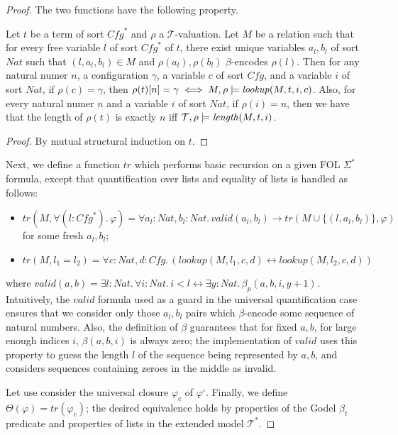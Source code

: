 \begin{proof}
The two functions have the following property.
\begin{lemma}
  Let $t$ be a term of sort $\mathit{Cfg}^*$ and $\rho$ a $\mathcal{T}$-valuation.
  Let $M$ be a relation such that for every free variable $l$ of sort $\mathit{Cfg}^*$ of $t$, there exist unique variables $a_l,b_l$ of sort $\mathit{Nat}$
  such that $(l,a_l,b_l) \in M$ and $\rho(a_l),\rho(b_l)$ $\beta$-encodes $\rho(l)$.
  Then for any natural numer $n$,
  a configuration $\gamma$, a variable $c$ of sort $\mathit{Cfg}$, and a variable $i$ of sort $\mathit{Nat}$,
  if $\rho(c) = \gamma$, then $\rho(t)[n] = \gamma \iff M,\rho \models \mathit{lookup}(M, t, i, c)$.
  Also, for every natural numer $n$ and a variable $i$ of sort $\mathit{Nat}$,
  if $\rho(i) = n$, then
  we have that the length of $\rho(t)$ is exactly $n$ iff $\mathcal{T}, \rho \models \mathit{length}(M, t, i)$.
\end{lemma}
\begin{proof}
By mutual structural induction on $t$.
\end{proof}

Next, we define a function $\mathit{tr}$ which performs basic recursion on a given FOL $\Sigma^*$ formula,
except that quantification over lists and equality of lists is handled as follows:
\begin{itemize}
    \item $\mathit{tr}(M, \forall (l : \mathit{Cfg}^*).\, \varphi) = \forall a_l : \mathit{Nat}, b_l : \mathit{Nat}.\, \mathit{valid}(a_l,b_l) \rightarrow \mathit{tr}(M \cup \{ (l, a_l, b_l) \}, \varphi)$
    for some fresh $a_l,b_l$;
    \item $\mathit{tr}(M, l_1 = l_2) = \forall c : \mathit{Nat}, d:\mathit{Cfg}.\, ( \mathit{lookup}(M, l_1, c, d) \leftrightarrow \mathit{lookup}(M, l_2, c, d))$
\end{itemize}
where $\mathit{valid}(a,b) = \exists l:\mathit{Nat}.\, \forall i:\mathit{Nat}.\, i < l \leftrightarrow \exists y:\mathit{Nat}.\, \beta_p(a,b,i,y+1)$.
Intuitively, the $\mathit{valid}$ formula used as a guard in the universal quantification case ensures that we consider only those $a_l,b_l$ pairs
which $\beta$-encode some sequence of natural numbers.
Also, the definition of $\beta$ guarantees that for fixed $a,b$, for large enough indices $i$, $\beta(a,b,i)$ is always zero;
the implementation of $\mathit{valid}$ uses this property to guess the length $l$ of the sequence being represented by $a,b$,
and considers sequences containing zeroes in the middle as invalid.

Let use consider the universal closure $\varphi_c$ of $\varphi^\square$.
Finally, we define $\Theta(\varphi) = \mathit{tr}(\varphi_c)$; the desired equivalence holds by
properties of the Godel $\beta_t$ predicate and properties of lists in the extended model $\mathcal{T}^*$.

\end{proof}

